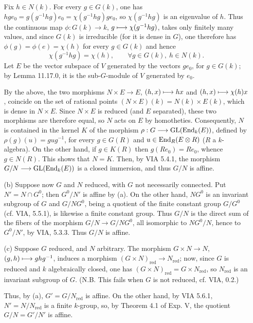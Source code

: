 Fix $h\in N(k)$. For every $g\in G(k)$, one has $hge_0=g(g^{-1}hg)e_0=\chi(g^{-1}hg)ge_0$, so $\chi(g^{-1}hg)$ is an eigenvalue of $h$. Thus the continuous map $\phi:G(k)\to k$, $g\longmapsto\chi(g^{-1}hg)$, takes only finitely many values, and since $G(k)$ is irreducible (for it is dense in $G$), one therefore has $\phi(g)=\phi(e)=\chi(h)$ for every $g\in G(k)$ and hence
\[
\chi(g^{-1}hg)=\chi(h),\qquad\forall g\in G(k),\ h\in N(k).
\]
Let $E$ be the vector subspace of $V$ generated by the vectors $ge_0$, for $g\in G(k)$; by Lemma 11.17.0, it is the sub-$G$-module of $V$ generated by $e_0$.

By the above, the two morphisms $N\times E\to E$, $(h,x)\longmapsto hx$ and $(h,x)\longmapsto\chi(h)x$, coincide on the set of rational points $(N\times E)(k)=N(k)\times E(k)$, which is dense in $N\times E$. Since $N\times E$ is reduced (and $E$ separated), these two morphisms are therefore equal, so $N$ acts on $E$ by homotheties. Consequently, $N$ is contained in the kernel $K$ of the morphism $\rho:G\longrightarrow\operatorname{GL}(\operatorname{End}_k(E))$, defined by $\rho(g)(u)=gug^{-1}$, for every $g\in G(R)$ and $u\in\operatorname{End}_R(E\otimes R)$ ($R$ a $k$-algebra). On the other hand, if $g\in K(R)$ then $g(Re_0)=Re_0$, whence $g\in N(R)$. This shows that $N=K$. Then, by VIA 5.4.1, the morphism $G/N\longrightarrow\operatorname{GL}(\operatorname{End}_k(E))$ is a closed immersion, and thus $G/N$ is affine.

(b) Suppose now $G$ and $N$ reduced, with $G$ not necessarily connected. Put $N'=N\cap G^0$; then $G^0/N'$ is affine by (a). On the other hand, $NG^0$ is an invariant subgroup of $G$ and $G/NG^0$, being a quotient of the finite constant group $G/G^0$ (cf. VIA, 5.5.1), is likewise a finite constant group. Thus $G/N$ is the direct sum of the fibers of the morphism $G/N\to G/NG^0$, all isomorphic to $NG^0/N$, hence to $G^0/N'$, by VIA, 5.3.3. Thus $G/N$ is affine.

(c) Suppose $G$ reduced, and $N$ arbitrary. The morphism $G\times N\to N$, $(g,h)\longmapsto ghg^{-1}$, induces a morphism $(G\times N)_{\mathrm{red}}\to N_{\mathrm{red}}$; now, since $G$ is reduced and $k$ algebraically closed, one has $(G\times N)_{\mathrm{red}}=G\times N_{\mathrm{red}}$, so $N_{\mathrm{red}}$ is an invariant subgroup of $G$. (N.B. This fails when $G$ is not reduced, cf. VIA, 0.2.)

Thus, by (a), $G'=G/N_{\mathrm{red}}$ is affine. On the other hand, by VIA 5.6.1, $N'=N/N_{\mathrm{red}}$ is a finite $k$-group, so, by Theorem 4.1 of Exp. V, the quotient $G/N=G'/N'$ is affine.

